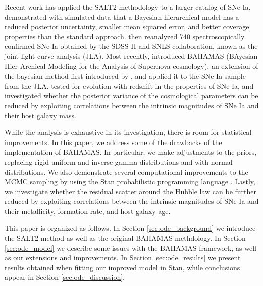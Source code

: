 Recent work has applied the SALT2 methodology to a larger catalog of SNe Ia. \citet{March+others:2011} demonstrated with simulated data that a Bayesian hierarchical model has a reduced posterior uncertainty, smaller mean squared error, and better coverage properties than the standard approach. \citet{Betoule+others:2014} then reanalyzed 740 spectroscopically confirmed SNe Ia obtained by the SDSS-II and SNLS collaboration, known as the joint light curve analysis (JLA). Most recently, \citet{Shariff+others:2016} introduced BAHAMAS (BAyesian Hier-Archical Modeling for the Analysis of Supernova cosmology), an extension of the bayesian method first introduced by \citet{March+others:2011}, and applied it to the SNe Ia sample from the JLA. \citet{Shariff+others:2016} tested for evolution with redshift in the properties of SNe Ia, and investigated whether the posterior variance of the cosmological parameters can be reduced by exploiting correlations between the intrinsic magnitudes of SNe Ia and their host galaxy mass.

While the \citet{Shariff+others:2016} analysis is exhaustive in its investigation, there is room for statistical improvements. In this paper, we address some of the drawbacks of the \citet{Shariff+others:2016} implementation of BAHAMAS. In particular, we make adjustments to the priors, replacing rigid uniform and inverse gamma distributions and with normal distributions. We also demonstrate several computational improvements to the MCMC sampling by using the Stan probabilistic programming language \citep{Stan:2016}. Lastly, we investigate whether the residual scatter around the Hubble law can be further reduced by exploiting correlations between the intrinsic magnitudes of SNe Ia and their metallicity, formation rate, and host galaxy age.

This paper is organized as follows. In Section \ref{sec:ode_background} we introduce the SALT2 method as well as the original BAHAMAS methdology. In Section \ref{sec:ode_model} we describe some issues with the BAHAMAS framework, as well as our extensions and improvements. In Section \ref{sec:ode_results} we present results obtained when fitting our improved model in Stan, while conclusions appear in Section \ref{sec:ode_discussion}.